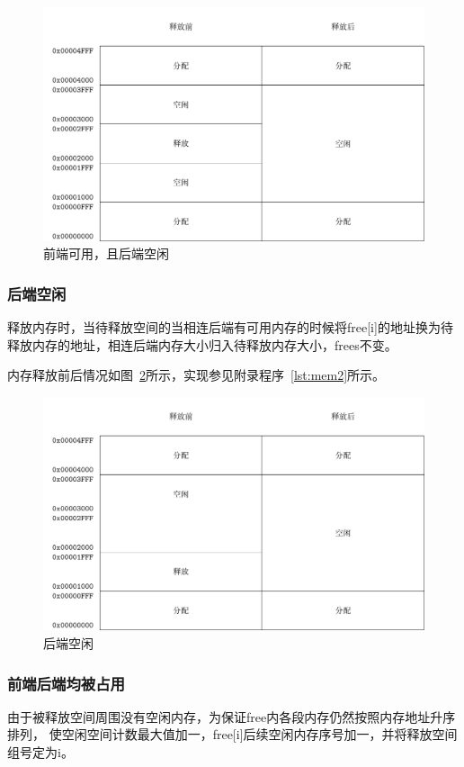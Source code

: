 \begin{figure}[H]
  \centering
  \includegraphics[width=.7\textwidth]{../Fig/mem/mem1.pdf}
  \caption{前端可用，且后端空闲}
  \label{fig:mem1}
\end{figure}


\subsubsection{后端空闲}

释放内存时，当待释放空间的当相连后端有可用内存的时候将free[i]的地址换为待释放内存的地址，相连后端内存大小归入待释放内存大小，frees不变。

内存释放前后情况如图~\ref{fig:mem2}所示，实现参见附录程序~\ref{lst:mem2}所示。

\begin{figure}[H]
  \centering
  \includegraphics[width=.7\textwidth]{../Fig/mem/mem2.pdf}
  \caption{后端空闲}
  \label{fig:mem2}
\end{figure}


\subsubsection{前端后端均被占用}

由于被释放空间周围没有空闲内存，为保证free内各段内存仍然按照内存地址升序排列，
使空闲空间计数最大值加一，free[i]后续空闲内存序号加一，并将释放空间组号定为i。


